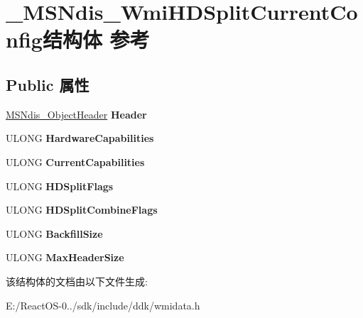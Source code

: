 \hypertarget{struct___m_s_ndis___wmi_h_d_split_current_config}{}\section{\+\_\+\+M\+S\+Ndis\+\_\+\+Wmi\+H\+D\+Split\+Current\+Config结构体 参考}
\label{struct___m_s_ndis___wmi_h_d_split_current_config}
\subsection*{Public 属性}
\begin{DoxyCompactItemize}
\item 
\mbox{\label{struct___m_s_ndis___wmi_h_d_split_current_config_a4aaeb5be0d5a1e5f2780f82d601e2df8}} 
\hyperlink{struct___m_s_ndis___object_header}{M\+S\+Ndis\+\_\+\+Object\+Header} {\bfseries Header}
\item 
\mbox{\label{struct___m_s_ndis___wmi_h_d_split_current_config_a277348b9df314cae3a0a924e12603b34}} 
U\+L\+O\+NG {\bfseries Hardware\+Capabilities}
\item 
\mbox{\label{struct___m_s_ndis___wmi_h_d_split_current_config_a51d5598429802a51dccc5dc05697b80b}} 
U\+L\+O\+NG {\bfseries Current\+Capabilities}
\item 
\mbox{\label{struct___m_s_ndis___wmi_h_d_split_current_config_aa5df3e56b4294406850e8caae7e00e74}} 
U\+L\+O\+NG {\bfseries H\+D\+Split\+Flags}
\item 
\mbox{\label{struct___m_s_ndis___wmi_h_d_split_current_config_a30b5cf054780030de791fbcf6ab52de2}} 
U\+L\+O\+NG {\bfseries H\+D\+Split\+Combine\+Flags}
\item 
\mbox{\label{struct___m_s_ndis___wmi_h_d_split_current_config_abf432c9d2502d9301f1657a4c5fb2a22}} 
U\+L\+O\+NG {\bfseries Backfill\+Size}
\item 
\mbox{\label{struct___m_s_ndis___wmi_h_d_split_current_config_a822fc994a0c539f38912a91012f9d3b6}} 
U\+L\+O\+NG {\bfseries Max\+Header\+Size}
\end{DoxyCompactItemize}


该结构体的文档由以下文件生成\+:\begin{DoxyCompactItemize}
\item 
E\+:/\+React\+O\+S-\/0../sdk/include/ddk/wmidata.\+h\end{DoxyCompactItemize}
